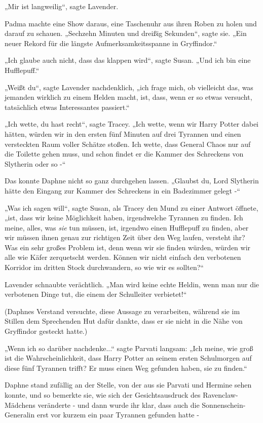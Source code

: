 {„Mir ist langweilig“, sagte Lavender.

Padma machte eine Show daraus, eine Taschenuhr aus ihren Roben zu holen und darauf zu schauen. „Sechzehn Minuten und dreißig Sekunden“, sagte sie. „Ein neuer Rekord für die längste Aufmerksamkeitsspanne in Gryffindor.“

„Ich glaube auch nicht, dass das klappen wird“, sagte Susan. „Und ich bin eine Hufflepuff.“

„Weißt du“, sagte Lavender nachdenklich, „ich frage mich, ob vielleicht das, was jemanden wirklich zu einem Helden macht, ist, dass, wenn er so etwas versucht, tatsächlich etwas Interessantes passiert.“

„Ich wette, du hast recht“, sagte Tracey. „Ich wette, wenn wir Harry Potter dabei hätten, würden wir in den ersten fünf Minuten auf drei Tyrannen und einen versteckten Raum voller Schätze stoßen. Ich wette, dass General Chaos nur auf die Toilette gehen muss, und schon findet er die Kammer des Schreckens von Slytherin oder so -“

Das konnte Daphne nicht so ganz durchgehen lassen. „Glaubst du, Lord Slytherin hätte den Eingang zur Kammer des Schreckens in ein Badezimmer gelegt -“

„Was ich sagen will“, sagte Susan, als Tracey den Mund zu einer Antwort öffnete, „ist, dass wir keine Möglichkeit haben, irgendwelche Tyrannen zu finden. Ich meine, alles, was \emph{sie} tun müssen, ist, irgendwo einen Hufflepuff zu finden, aber wir müssen ihnen genau zur richtigen Zeit über den Weg laufen, versteht ihr? Was ein sehr großes Problem ist, denn wenn wir sie finden würden, würden wir alle wie Käfer zerquetscht werden. Können wir nicht einfach den verbotenen Korridor im dritten Stock durchwandern, so wie wir es sollten?“

Lavender schnaubte verächtlich. „Man wird keine echte Heldin, wenn man nur die verbotenen Dinge tut, die einem der Schulleiter verbietet!“

(Daphnes Verstand versuchte, diese Aussage zu verarbeiten, während sie im Stillen dem Sprechenden Hut dafür dankte, dass er sie nicht in die Nähe von Gryffindor gesteckt hatte.)

„Wenn ich so darüber nachdenke...“ sagte Parvati langsam: „Ich meine, wie groß ist die Wahrscheinlichkeit, dass Harry Potter an seinem ersten Schulmorgen auf diese fünf Tyrannen trifft? Er muss einen Weg gefunden haben, sie zu finden.“

Daphne stand zufällig an der Stelle, von der aus sie Parvati und Hermine sehen konnte, und so bemerkte sie, wie sich der Gesichtsausdruck des Ravenclaw-Mädchens veränderte - und dann wurde ihr klar, dass auch die Sonnenschein-Generalin erst vor kurzem ein paar Tyrannen gefunden hatte -

}

